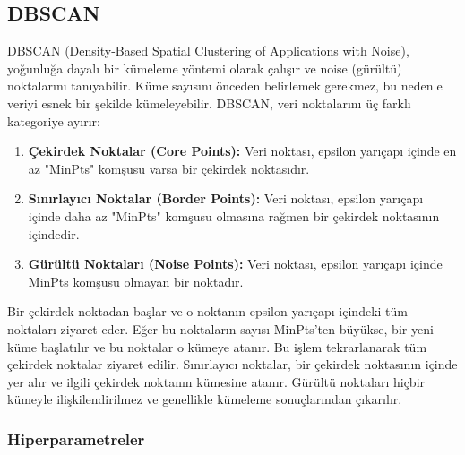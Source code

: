 \newpage

\subsection{DBSCAN}
DBSCAN (Density-Based Spatial Clustering of Applications with Noise), yoğunluğa dayalı bir kümeleme yöntemi olarak çalışır ve noise (gürültü) noktalarını tanıyabilir. Küme sayısını önceden belirlemek gerekmez, bu nedenle veriyi esnek bir şekilde kümeleyebilir. DBSCAN, veri noktalarını üç farklı kategoriye ayırır:
\begin{enumerate}
    \item \textbf{Çekirdek Noktalar (Core Points):} Veri noktası, epsilon yarıçapı içinde en az "MinPts" komşusu varsa bir çekirdek noktasıdır.
    \item \textbf{Sınırlayıcı Noktalar (Border Points):} Veri noktası, epsilon yarıçapı içinde daha az "MinPts" komşusu olmasına rağmen bir çekirdek noktasının içindedir.
    \item \textbf{Gürültü Noktaları (Noise Points):} Veri noktası, epsilon yarıçapı içinde MinPts komşusu olmayan bir noktadır.
\end{enumerate}

Bir çekirdek noktadan başlar ve o noktanın epsilon yarıçapı içindeki tüm noktaları ziyaret eder. Eğer bu noktaların sayısı MinPts'ten büyükse, bir yeni küme başlatılır ve bu noktalar o kümeye atanır. Bu işlem tekrarlanarak tüm çekirdek noktalar ziyaret edilir. Sınırlayıcı noktalar, bir çekirdek noktasının içinde yer alır ve ilgili çekirdek noktanın kümesine atanır. Gürültü noktaları hiçbir kümeyle ilişkilendirilmez ve genellikle kümeleme sonuçlarından çıkarılır.

\subsubsection{Hiperparametreler}

